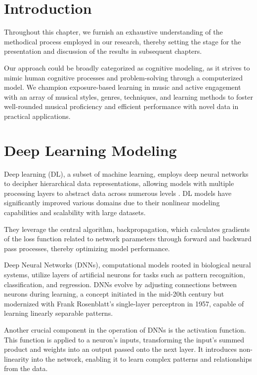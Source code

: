 \section{Introduction}


Throughout this chapter, we furnish an exhaustive understanding of the methodical process employed in our research, thereby setting the stage for the presentation and discussion of the results in subsequent chapters.

Our approach could be broadly categorized as cognitive modeling, as it strives to mimic human cognitive processes and problem-solving through a computerized model. We champion exposure-based learning in music and active engagement with an array of musical styles, genres, techniques, and learning methods to foster well-rounded musical proficiency and efficient performance with novel data in practical applications.

\section{Deep Learning Modeling}

Deep learning (DL), a subset of machine learning, employs deep neural networks to decipher hierarchical data representations, allowing models with multiple processing layers to abstract data across numerous levels \cite{LeCun2015DeepLearning}. DL models have significantly improved various domains due to their nonlinear modeling capabilities and scalability with large datasets.

They leverage the central algorithm, backpropagation, which calculates gradients of the loss function related to network parameters through forward and backward pass processes, thereby optimizing model performance.



Deep Neural Networks (DNNs), computational models rooted in biological neural systems, utilize layers of artificial neurons for tasks such as pattern recognition, classification, and regression. DNNs evolve by adjusting connections between neurons during learning, a concept initiated in the mid-20th century but modernized with Frank Rosenblatt's single-layer perceptron in 1957, capable of learning linearly separable patterns.



Another crucial component in the operation of DNNs is the activation function. This function is applied to a neuron's inputs, transforming the input's summed product and weights into an output passed onto the next layer. It introduces non-linearity into the network, enabling it to learn complex patterns and relationships from the data.





\newpage


